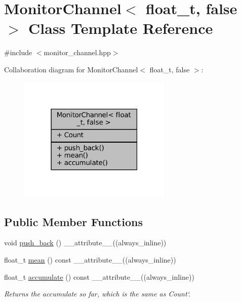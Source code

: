 \hypertarget{classMonitorChannel_3_01float__t_00_01false_01_4}{}\section{Monitor\+Channel$<$ float\+\_\+t, false $>$ Class Template Reference}
\label{classMonitorChannel_3_01float__t_00_01false_01_4}


{\ttfamily \#include $<$monitor\+\_\+channel.\+hpp$>$}



Collaboration diagram for Monitor\+Channel$<$ float\+\_\+t, false $>$\+:\nopagebreak
\begin{figure}[H]
\begin{center}
\leavevmode
\includegraphics[width=207pt]{da/da7/classMonitorChannel_3_01float__t_00_01false_01_4__coll__graph}
\end{center}
\end{figure}
\subsection*{Public Member Functions}
\begin{DoxyCompactItemize}
\item 
void \hyperlink{classMonitorChannel_3_01float__t_00_01false_01_4_acf06bae19966139c299c87d3ce215fd1}{push\+\_\+back} () \+\_\+\+\_\+attribute\+\_\+\+\_\+((always\+\_\+inline))
\item 
float\+\_\+t \hyperlink{classMonitorChannel_3_01float__t_00_01false_01_4_ad035163ed9dddabf74393e7e7570d8eb}{mean} () const \+\_\+\+\_\+attribute\+\_\+\+\_\+((always\+\_\+inline))
\item 
float\+\_\+t \hyperlink{classMonitorChannel_3_01float__t_00_01false_01_4_afc9f578ffade7852c31557b2145e55bd}{accumulate} () const \+\_\+\+\_\+attribute\+\_\+\+\_\+((always\+\_\+inline))
\begin{DoxyCompactList}\small\item\em Returns the accumulate so far, which is the same as \textquotesingle{}Count`. \end{DoxyCompactList}\end{DoxyCompactItemize}
